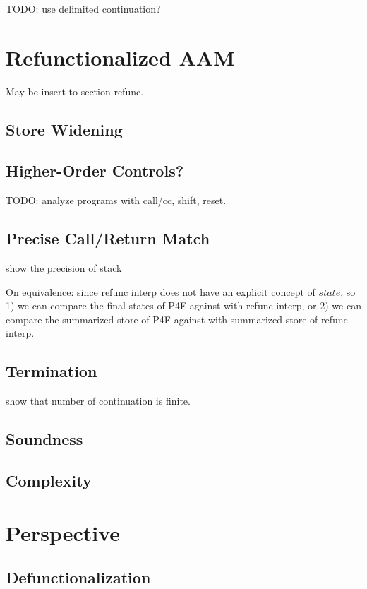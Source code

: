 \documentclass[acmsmall,review,anonymous]{acmart}\settopmatter{printfolios=true,printccs=false,printacmref=false}
\begin{document}
TODO: use delimited continuation? 

\section{Refunctionalized AAM}

May be insert to section refunc.

\subsection{Store Widening}

\subsection{Higher-Order Controls?}

TODO: analyze programs with call/cc, shift, reset.

\subsection{Precise Call/Return Match}

show the precision of stack

On equivalence: since refunc interp does not have an explicit concept of $state$,
so 1) we can compare the final states of P4F against with refunc interp,
or 2) we can compare the summarized store of P4F against with summarized store of refunc interp.

\subsection{Termination}

show that number of continuation is finite.

\subsection{Soundness}

\subsection{Complexity}

\section{Perspective}

\subsection{Defunctionalization}
\end{document}
